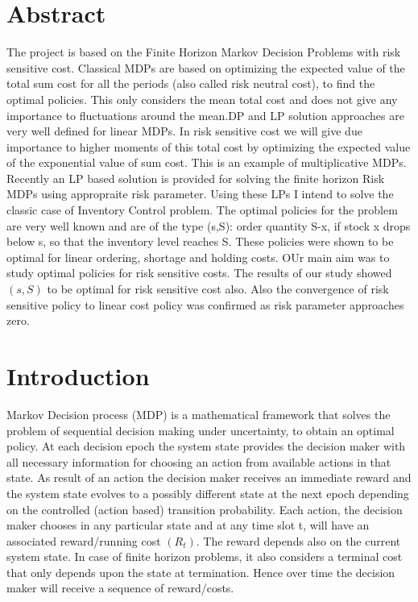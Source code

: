 \documentclass[11pt,a4paper,oneside]{report}
\begin{document}
\chapter*{Abstract}
The project is based on the Finite Horizon Markov Decision Problems with risk sensitive cost. Classical MDPs are based on optimizing the expected value of the total sum cost for all the periods (also called risk neutral cost), to find the optimal policies. This only considers the mean total cost and does not give any importance to fluctuations around the mean.DP and LP solution approaches are very  well  defined for linear MDPs. In risk sensitive cost we will give due importance to higher moments of this total cost by optimizing the expected value of the exponential value of sum cost. This is an example of multiplicative MDPs. Recently an LP based solution is provided for solving the finite horizon Risk MDPs using appropraite risk parameter. Using these LPs I intend to solve the classic case of Inventory Control problem. The optimal policies for the problem are very well known and are of the type (s,S): order quantity S-x, if stock x drops below s, so that the inventory level reaches S. These policies were shown to be optimal for linear ordering, shortage and holding costs. OUr main aim  was to study optimal policies for risk sensitive costs. The results of our study showed $(s,S)$ to be optimal for risk sensitive cost also. Also the convergence of risk sensitive policy to linear cost policy was confirmed as risk parameter approaches zero.
\tableofcontents
\listoftables
\chapter{Introduction}

Markov Decision process (MDP) is a mathematical framework that solves the problem of sequential decision making under uncertainty, to obtain an optimal policy. At each decision epoch the system state provides the decision maker with all necessary information for choosing an action from available actions in that state. As result of an action the decision maker receives an immediate reward and the system state evolves to a possibly different state at the next epoch depending on the controlled (action based) transition probability. Each action, the decision maker chooses in any particular state and at any time slot t, will have an associated reward/running cost $(R_t)$. The reward depends also on the current system state. In case of finite horizon problems, it also considers a terminal cost that only depends upon the state at termination. Hence over time the decision maker will receive a sequence of reward/costs.\\
\end{document}
